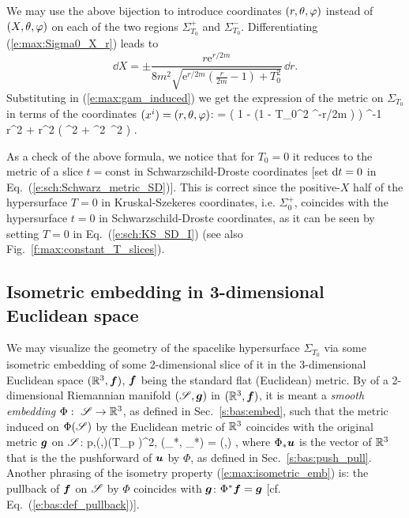 We may use the above bijection to introduce coordinates $(r,\theta,\varphi)$ instead of $(X,\theta,\varphi)$
on each of the two regions $\Sigma^+_{T_0}$ and $\Sigma^-_{T_0}$.
Differentiating (\ref{e:max:Sigma0_X_r}) leads to
\[
    \dd X = \pm \frac{r \mathrm{e}^{r/2m}}{8m^2 \sqrt{\mathrm{e}^{r/2m} \left( \frac{r}{2m} - 1 \right) + T_0^2}} \, \dd r .
\]
Substituting in (\ref{e:max:gam_induced}) we get the expression of the
metric on $\Sigma_{T_0}$ in terms of the coordinates $(x^i) = (r,\theta,\varphi)$:
\be \label{e:max:Sigma0_metric}
    \w{\gamma} = \left(
    1 -  \left(1 -  T_0^2 ^{-r/2m} \right) \right) ^{-1} \, \dd r^2
     +  r^2 \left( \dd\th^2 + \sin^2\th\, \dd\ph^2 \right) .
\ee
\begin{remark} \label{r:max:check_metric_SigmaT0}
As a check of the above formula, we notice that for $T_0=0$ it reduces to the
metric of a slice $t=\mathrm{const}$ in Schwarzschild-Droste coordinates
[set $\mathrm{d} t =0$ in Eq.~(\ref{e:sch:Schwarz_metric_SD})]. This is correct since
the positive-$X$ half of the hypersurface $T=0$ in Kruskal-Szekeres coordinates,
i.e. $\Sigma_0^+$,
coincides with the hypersurface $t=0$ in Schwarzschild-Droste coordinates,
as it can be seen by setting $T=0$ in Eq.~(\ref{e:sch:KS_SD_I})
(see also Fig.~\ref{f:max:constant_T_slices}).
\end{remark}

\subsection{Isometric embedding in 3-dimensional Euclidean space}
\label{s:max:isometric_emb}

We may visualize the geometry of the spacelike hypersurface $\Sigma_{T_0}$
via some isometric embedding of some 2-dimensional slice of it
in the 3-dimensional Euclidean space $(\mathbb{R}^3, \bm{f})$, $\bm{f}$ being the standard
flat (Euclidean) metric.
By 
of a 2-dimensional Riemannian manifold $(\mathscr{S},\bm{g})$
in $(\mathbb{R}^3,\bm{f})$, it is meant a \emph{smooth embedding} $\Phi:\ \mathscr{S} \rightarrow \mathbb{R}^3$,
as defined in Sec.~\ref{s:bas:embed},
such that the metric induced on $\Phi(\mathscr{S})$ by the Euclidean metric of $\mathbb{R}^3$
coincides with the original metric $\bm{g}$ on $\mathscr{S}$:
\be \label{e:max:isometric_emb}
    \forall p\in \Sp,\quad  \forall (,)\in (T_p \Sp)^2,\quad
        (\Phi_*, \Phi_*) = (,) ,
\ee
where $\Phi_*\bm{u}$ is the vector of $\mathbb{R}^3$ that is the
the pushforward of $\bm{u}$ by $\Phi$, as defined in
Sec.~\ref{s:bas:push_pull}. Another phrasing of the
isometry property (\ref{e:max:isometric_emb}) is: the pullback of $\bm{f}$
on $\mathscr{S}$ by $\Phi$ coincides with $\bm{g}$: $\Phi^*\bm{f} = \bm{g}$ [cf. Eq.~(\ref{e:bas:def_pullback})].

